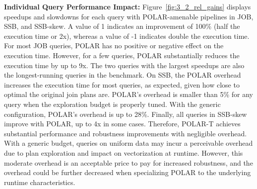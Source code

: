 \textbf{Individual Query Performance Impact:} Figure~\ref{fig:3_2_rel_gains} displays speedups and slowdowns for each query with POLAR-amenable pipelines in JOB, SSB, and SSB-skew. A value of 1 indicates an improvement of 100\% (\ie half the execution time or 2x), whereas a value of -1 indicates double the execution time. For most JOB queries, POLAR has no positive or negative effect on the execution time. However, for a few queries, POLAR substantially reduces the execution time by up to 9x. The two queries with the largest speedups are also the longest-running queries in the benchmark. On SSB, the POLAR overhead increases the execution time for most queries, as expected, given how close to optimal the original join plans are. POLAR's overhead is smaller than 5\% for any query when the exploration budget is properly tuned. With the generic configuration, POLAR's overhead is up to 28\%. Finally, all queries in SSB-skew improve with POLAR, up to 4x in some cases. Therefore, POLAR-T achieves substantial performance and robustness improvements with negligible overhead. With a generic budget, queries on uniform data may incur a perceivable overhead due to plan exploration and impact on vectorization at runtime. However, this moderate overhead is an acceptable price to pay for increased robustness, and the overhead could be further decreased when specializing POLAR to the underlying runtime characteristics.

